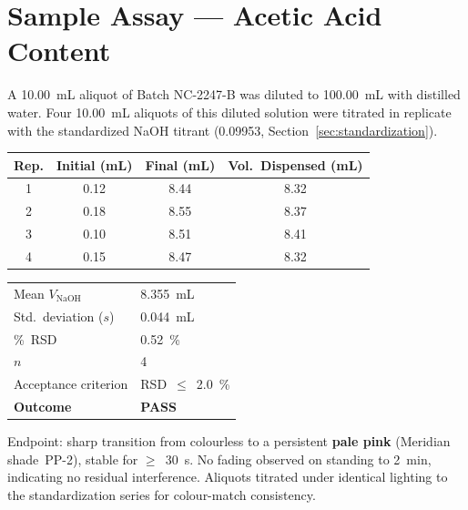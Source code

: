 \section{Sample Assay --- Acetic Acid Content}
\label{sec:sample-assay}
\sectionrule

A 10.00~mL aliquot of Batch NC-2247-B was diluted to 100.00~mL with distilled water. Four
10.00~mL aliquots of this diluted solution were titrated in replicate with the standardized
NaOH titrant (\SI{0.09953}{\Molar}, Section~\ref{sec:standardization}).

\begin{center}
\begin{tabular}{c S[table-format=1.2] S[table-format=2.2] S[table-format=1.2]}
\toprule
{}
{\color{white}\bfseries Rep.} & {\color{white}\bfseries Initial (mL)} & {\color{white}\bfseries Final (mL)} & {\color{white}\bfseries Vol.\ Dispensed (mL)} \\
 & 0.12 & 8.44 & 8.32 \\
2 & 0.18 & 8.55 & 8.37 \\
3 & 0.10 & 8.51 & 8.41 \\
4 & 0.15 & 8.47 & 8.32 \\
\bottomrule
\end{tabular}
\end{center}

\vspace{6pt}

\noindent
\begin{minipage}[t]{0.48\linewidth}
\begin{tcolorbox}[statpanel,title=Replicate Mean \& SD]
\begin{tabular}{@{}ll@{}}
Mean $V_{\text{NaOH}}$ & \SI{8.355}{\milli\liter} \\
Std.\ deviation ($s$) & \SI{0.044}{\milli\liter} \\
\%~RSD & \SI{0.52}{\percent} \\
$n$ & 4 \\
Acceptance criterion & RSD~$\leq$~\SI{2.0}{\percent} \\
\textbf{Outcome} & \textbf{\color{assayteal}PASS} \\
\end{tabular}
\end{tcolorbox}
\end{minipage}\hfill
\begin{minipage}[t]{0.48\linewidth}
\begin{tcolorbox}[colournote,title=Endpoint Colour Note]
Endpoint: sharp transition from colourless to a persistent \textbf{pale pink}
(Meridian shade~PP-2), stable for $\geq$~30~s. No fading observed on standing to
2~min, indicating no residual  interference. Aliquots titrated under
identical lighting to the standardization series for colour-match consistency.
\end{tcolorbox}
\end{minipage}
